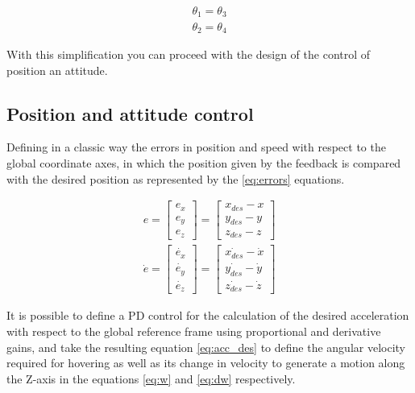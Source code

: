 \documentclass[a4paper, 12pt, oneside]{book}
\begin{document}
\begin{equation}
\begin{multlined}
\theta_1=\theta_3 \\
\theta_2=\theta_4
\end{multlined}
\label{eq:match_angle}
\end{equation}

With this simplification you can proceed with the design of the control of position an attitude.

\subsection{Position and attitude control}
Defining in a classic way the errors in position and speed with respect to the global coordinate axes, in which the position given by the feedback is compared with the desired position as represented by the \ref{eq:errors} equations.

\begin{equation}
\begin{split}
e=\begin{bmatrix}
e_x\\ 
e_y\\ 
e_z
\end{bmatrix}
=
\begin{bmatrix}
x_{des} - x \\ 
y_{des} - y\\ 
z_{des} - z
\end{bmatrix}\\
\dot{e}=\begin{bmatrix}
\dot{e_x}\\ 
\dot{e_y}\\ 
\dot{e_z}
\end{bmatrix}
=
\begin{bmatrix}
\dot{x_{des}} - \dot{x} \\ 
\dot{y_{des}} - \dot{y}\\ 
\dot{z_{des}} - \dot{z}
\end{bmatrix}
\end{split}
\label{eq:errors}
\end{equation}

It is possible to define a PD control for the calculation of the desired acceleration with respect to the global reference frame using proportional and derivative gains, and take the resulting equation \ref{eq:acc_des} to define the angular velocity required for hovering as well as its change in velocity to generate a motion along the Z-axis in the equations \ref{eq:w} and \ref{eq:dw} respectively.
\end{document}
